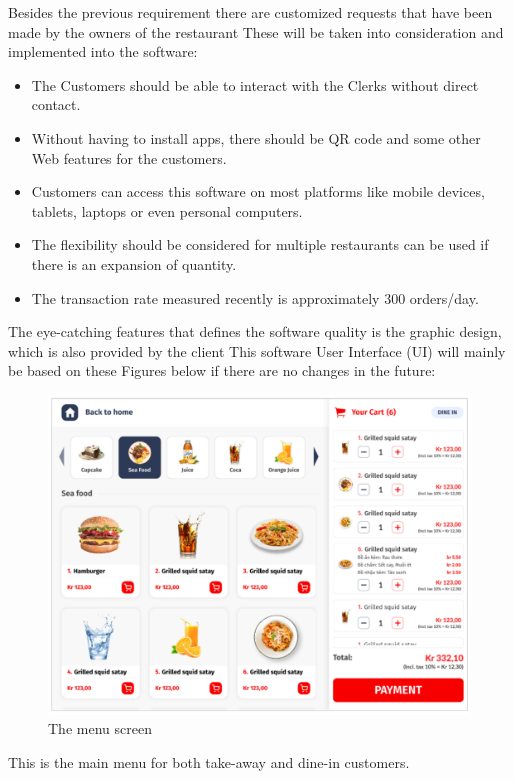 \documentclass[a4paper]{article}
\numberwithin{equation}{section}
\begin{document}
Besides the previous requirement there are customized requests that have been made by the owners of the restaurant
These will be taken into consideration and implemented into the software:

\begin{itemize}
  \item The Customers should be able to interact with the Clerks without direct contact.
  \item Without having to install apps, there should be QR code and some other Web features for the customers.
  \item Customers can access this software on most platforms like mobile devices, tablets, laptops or even personal computers.
  \item The flexibility should be considered for multiple restaurants can be used if there is an expansion of quantity.
  \item The transaction rate measured recently is approximately 300 orders/day.
\end{itemize}

The eye-catching features that defines the software quality is the graphic design, which is also provided by the client
This software User Interface (UI) will mainly be based on these Figures below if there are no changes in the future:

\begin{figure}[H]
  \centering
  \includegraphics[width=\textwidth]{UI_menu.png}
  \caption{The menu screen}
\end{figure}

This is the main menu for both take-away and dine-in customers.
\end{document}
